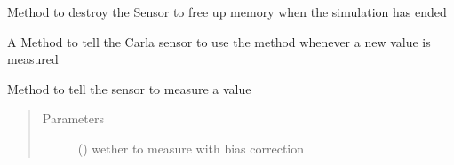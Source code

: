 \documentclass[letterpaper,10pt,english]{sphinxmanual}
\begin{document}
\begin{fulllineitems}

\begin{fulllineitems}
\label{\detokenize{sim_interfaces:lib.sim_interfaces.SimSensor.destroy}}
Method to destroy the Sensor to free up memory when the simulation has ended

\end{fulllineitems}


\begin{fulllineitems}
\label{\detokenize{sim_interfaces:lib.sim_interfaces.SimSensor.listen}}
A Method to tell the Carla sensor to use the {\hyperref[\detokenize{sim_interfaces:lib.sim_interfaces.SimSensor.callback}]{}} method whenever a new
value is measured

\end{fulllineitems}


\begin{fulllineitems}
\label{\detokenize{sim_interfaces:lib.sim_interfaces.SimSensor.measure}}
Method to tell the sensor to measure a value
\begin{quote}\begin{description}
\item[{Parameters}] \leavevmode
{} () \textendash{} wether to measure with bias correction

\end{description}\end{quote}

\end{fulllineitems}



\end{fulllineitems}
\end{document}

